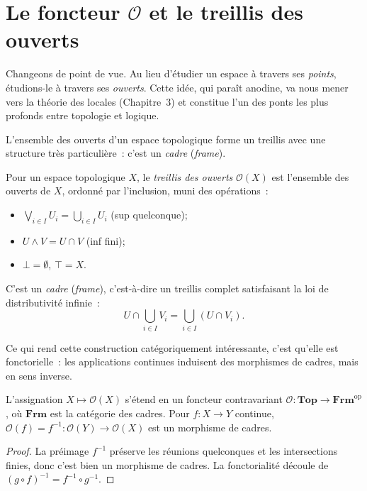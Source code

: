 \section{Le foncteur $\mathcal{O}$ et le treillis des ouverts}

Changeons de point de vue. Au lieu d'\'etudier un espace \`a travers ses
\emph{points}, \'etudions-le \`a travers ses \emph{ouverts}. Cette id\'ee, qui
para\^it anodine, va nous mener vers la th\'eorie des locales
(Chapitre~3) et constitue l'un des ponts les plus profonds entre topologie
et logique.

L'ensemble des ouverts d'un espace topologique forme un treillis avec une
structure tr\`es particuli\`ere~: c'est un \emph{cadre} (\emph{frame}).

\begin{definition}
Pour un espace topologique $X$, le \emph{treillis des ouverts} $\mathcal{O}(X)$ est
l'ensemble des ouverts de $X$, ordonn\'e par l'inclusion, muni des op\'erations~:
\begin{itemize}
  \item $\bigvee_{i\in I} U_i = \bigcup_{i\in I} U_i$ (sup quelconque);
  \item $U \wedge V = U \cap V$ (inf fini);
  \item $\bot = \emptyset$, $\top = X$.
\end{itemize}
C'est un \emph{cadre} (\emph{frame}), c'est-\`a-dire un treillis complet satisfaisant la
loi de distributivit\'e infinie~:
\[
  U \cap \bigcup_{i\in I} V_i = \bigcup_{i\in I}(U \cap V_i).
\]
\end{definition}

Ce qui rend cette construction cat\'egoriquement int\'eressante, c'est qu'elle
est fonctorielle~: les applications continues induisent des morphismes de
cadres, mais en sens inverse.

\begin{proposition}
L'assignation $X \mapsto \mathcal{O}(X)$ s'\'etend en un foncteur contravariant
$\mathcal{O}\colon \mathbf{Top} \to \mathbf{Frm}^{\mathrm{op}}$,
o\`u $\mathbf{Frm}$ est la cat\'egorie des cadres. Pour $f\colon X \to Y$ continue,
$\mathcal{O}(f) = f^{-1}\colon \mathcal{O}(Y) \to \mathcal{O}(X)$ est un morphisme
de cadres.
\end{proposition}

\begin{proof}
La pr\'eimage $f^{-1}$ pr\'eserve les r\'eunions quelconques et les intersections finies,
donc c'est bien un morphisme de cadres. La fonctorialit\'e d\'ecoule de
$(g \circ f)^{-1} = f^{-1} \circ g^{-1}$.
\end{proof}

